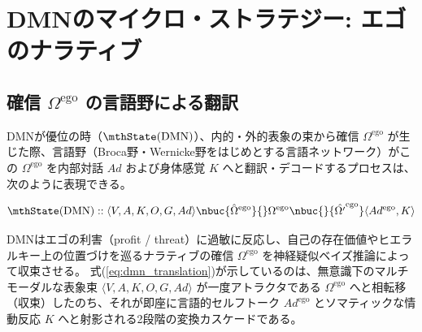 \chapter{DMNのマイクロ・ストラテジー: エゴのナラティブ}
\section{確信 $\Omega^{\mathrm{ego}}$ の言語野による翻訳}

DMNが優位の時（$\mthState(\mathrm{DMN})$）、内的・外的表象の束から確信 $\Omega^{\mathrm{ego}}$ が生じた際、言語野（Broca野・Wernicke野をはじめとする言語ネットワーク）がこの $\Omega^{\mathrm{ego}}$ を内部対話 $Ad$ および身体感覚 $K$ へと翻訳・デコードするプロセスは、次のように表現できる。

\begin{equation}
    \mthState(\mathrm{DMN}) :: \langle V, A, K, O, G, Ad \rangle \nbuc{\hat{\Omega}^{\mathrm{ego}}}{} \Omega^{\mathrm{ego}} \nbuc{}{\hat{\Omega'}^{\mathrm{ego}}} \langle Ad^{\mathrm{ego}}, K \rangle
    \label{eq:dmn_translation}
\end{equation}

DMNはエゴの利害（profit / threat）に過敏に反応し、自己の存在価値やヒエラルキー上の位置づけを巡るナラティブの確信 $\Omega^{\mathrm{ego}}$ を神経疑似ベイズ推論によって収束させる。
式(\ref{eq:dmn_translation})が示しているのは、無意識下のマルチモーダルな表象束 $\langle V, A, K, O, G, Ad \rangle$ が一度アトラクタである $\Omega^{\mathrm{ego}}$ へと相転移（収束）したのち、それが即座に言語的セルフトーク $Ad^{\mathrm{ego}}$ とソマティックな情動反応 $K$ へと射影される2段階の変換カスケードである。

